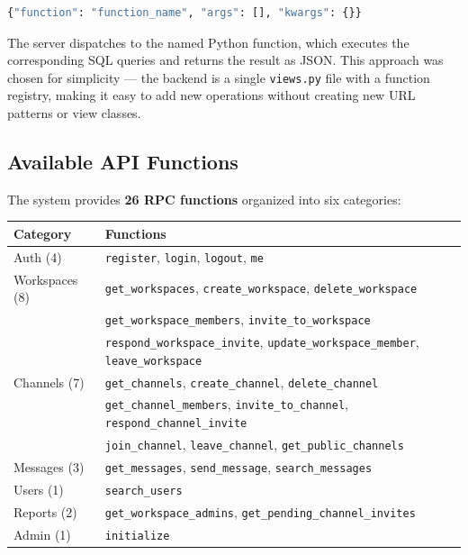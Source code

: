 \documentclass[11pt]{article}
\begin{document}
\begin{lstlisting}[language=Python]
{"function": "function_name", "args": [], "kwargs": {}}
\end{lstlisting}

The server dispatches to the named Python function, which executes the corresponding SQL queries and returns the result as JSON. This approach was chosen for simplicity --- the backend is a single \texttt{views.py} file with a function registry, making it easy to add new operations without creating new URL patterns or view classes.

\subsection{Available API Functions}

The system provides \textbf{26 RPC functions} organized into six categories:

\begin{center}
\small
\begin{tabular}{ll}
\toprule
Category & Functions \\
\midrule
Auth (4) & \texttt{register}, \texttt{login}, \texttt{logout}, \texttt{me} \\
Workspaces (8) & \texttt{get\_workspaces}, \texttt{create\_workspace}, \texttt{delete\_workspace} \\
 & \texttt{get\_workspace\_members}, \texttt{invite\_to\_workspace} \\
 & \texttt{respond\_workspace\_invite}, \texttt{update\_workspace\_member}, \texttt{leave\_workspace} \\
Channels (7) & \texttt{get\_channels}, \texttt{create\_channel}, \texttt{delete\_channel} \\
 & \texttt{get\_channel\_members}, \texttt{invite\_to\_channel}, \texttt{respond\_channel\_invite} \\
 & \texttt{join\_channel}, \texttt{leave\_channel}, \texttt{get\_public\_channels} \\
Messages (3) & \texttt{get\_messages}, \texttt{send\_message}, \texttt{search\_messages} \\
Users (1) & \texttt{search\_users} \\
Reports (2) & \texttt{get\_workspace\_admins}, \texttt{get\_pending\_channel\_invites} \\
Admin (1) & \texttt{initialize} \\
\bottomrule
\end{tabular}
\end{center}
\end{document}
